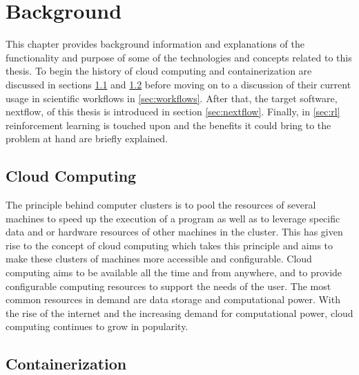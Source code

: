 
\cleardoublepage
\chapter{Background}
\label{cha:background}


This chapter provides background information and explanations of the functionality and purpose of some of the technologies and concepts related to this thesis.  To begin the history of cloud computing and containerization are discussed in sections \ref{sec:cloud} and \ref{sec:containers} before moving on to a discussion of their current usage in scientific workflows in \ref{sec:workflows}. After that, the target software, nextflow, of this thesis is introduced in section \ref{sec:nextflow}. Finally, in \ref{sec:rl} reinforcement learning is touched upon and the benefits it could bring to the problem at hand are briefly explained.

\section{Cloud Computing}
\label{sec:cloud}

The principle behind computer clusters is to pool the resources of several machines to speed up the execution of a program as well as to leverage specific data and or hardware resources of other machines in the cluster. This has given rise to the concept of cloud computing which takes this principle and aims to make these clusters of machines more accessible and configurable. Cloud computing aims to be available all the time and from anywhere, and to provide configurable computing resources to support the needs of the user. The most common resources in demand are data storage and computational power. With the rise of the internet and the increasing demand for  computational power, cloud computing continues to grow in popularity. 

\section{Containerization}
\label{sec:containers}

